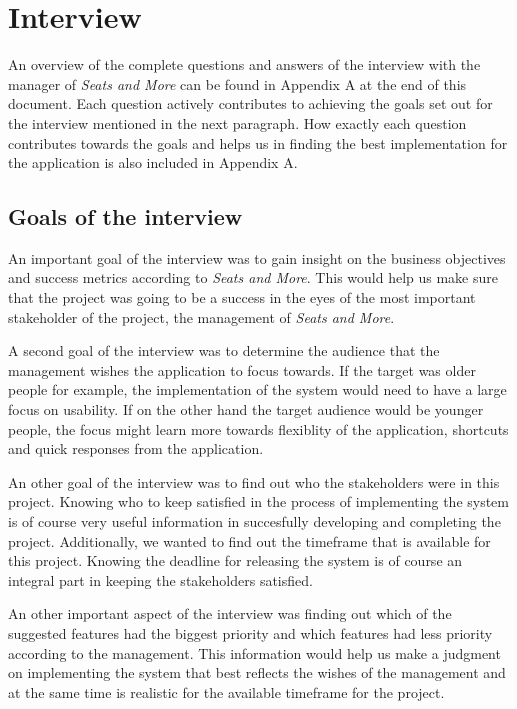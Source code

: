 \documentclass[a4paper]{article}
\begin{document}
\newpage

\section{Interview}
An overview of the complete questions and answers of the interview with the manager of \textit{Seats and More} can be found in Appendix A at the end of this document. Each question actively contributes to achieving the goals set out for the interview mentioned in the next paragraph. How exactly each question contributes towards the goals and helps us in finding the best implementation for the application is also included in Appendix A.

\subsection{Goals of the interview}
An important goal of the interview was to gain insight on the business objectives and success metrics according to \textit{Seats and More}. This would help us make sure that the project was going to be a success in the eyes of the most important stakeholder of the project, the management of \textit{Seats and More}. 

A second goal of the interview was to determine the audience that the management wishes the application to focus towards. If the target was older people for example, the implementation of the system would need to have a large focus on usability. If on the other hand the target audience would be younger people, the focus might learn more towards flexiblity of the application, shortcuts and quick responses from the application.

An other goal of the interview was to find out who the stakeholders were in this project. Knowing who to keep satisfied in the process of implementing the system is of course very useful information in succesfully developing and completing the project. Additionally, we wanted to find out the timeframe that is available for this project. Knowing the deadline for releasing the system is of course an integral part in keeping the stakeholders satisfied.

An other important aspect of the interview was finding out which of the suggested features had the biggest priority and which features had less priority according to the management. This information would help us make a judgment on implementing the system that best reflects the wishes of the management and at the same time is realistic for the available timeframe for the project.
\end{document}
